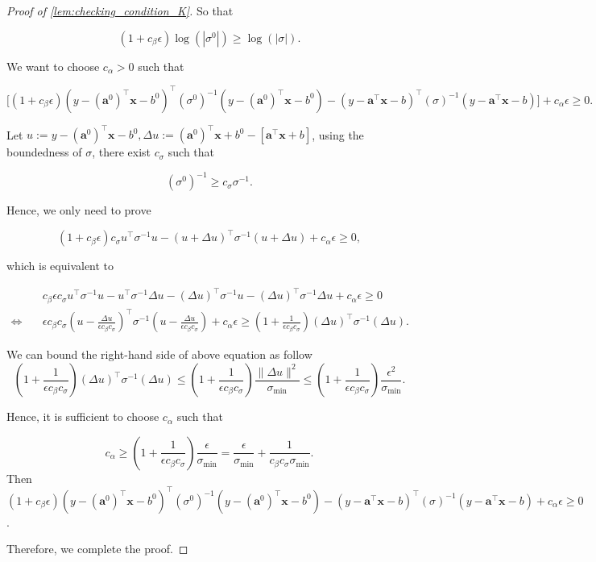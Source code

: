 \documentclass[10pt,a4paper]{amsart}
\def\va{{\bm{a}}}
\def\vx{{\bm{x}}}
\begin{document}
\begin{proof}[Proof of \cref{lem:checking_condition_K}]
So that

$$
\left(1+c_{\beta} \epsilon\right) \log \left(|\sigma^{0}|\right) \geq \log (|\sigma|).
$$

We want to choose $c_{\alpha}>0$ such that

$$
\Big[\left(1+c_{\beta} \epsilon\right)\left(y-(\va^{0})^{\top} \vx-b^{0}\right)^{\top}\left(\sigma^{0}\right)^{-1}\left(y-(\va^{0})^{\top} \vx-b^{0}\right)-(y-\va^{\top} \vx-b)^{\top}(\sigma)^{-1}(y-\va^{\top} \vx-b)\Big]+c_{\alpha} \epsilon \geq 0.
$$

Let $u:=y-(\va^{0})^{\top} \vx-b^{0}, \Delta u:= (\va^{0})^{\top} \vx+b^{0} - [\va^{\top} \vx+b]$, using the boundedness of $\sigma$, there exist $c_{\sigma}$ such that

$$(\sigma^{0})^{-1} \geq c_{\sigma} \sigma^{-1}.$$

Hence, we only need to prove

$$
\left(1+c_{\beta} \epsilon\right) c_{\sigma} u^{\top} \sigma^{-1} u-(u+\Delta u)^{\top} \sigma^{-1}(u+\Delta u)+c_{\alpha} \epsilon \geq 0,
$$

which is equivalent to

\begin{align*}
&c_{\beta} \epsilon c_{\sigma} u^{\top} \sigma^{-1} u-u^{\top} \sigma^{-1} \Delta u-(\Delta u)^{\top} \sigma^{-1} u-(\Delta u)^{\top} \sigma^{-1} \Delta u+c_{\alpha} \epsilon \geq 0 \\
\Leftrightarrow \quad&\epsilon c_{\beta} c_{\sigma}\left(u-\frac{\Delta u}{\epsilon c_{\beta} c_{\sigma}}\right)^{\top} \sigma^{-1}\left(u-\frac{\Delta u}{\epsilon c_{\beta} c_{\sigma}}\right)+c_{\alpha} \epsilon \geq\left(1+\frac{1}{\epsilon c_{\beta} c_{\sigma}}\right)(\Delta u)^{\top} \sigma^{-1}(\Delta u) .
\end{align*}


We can bound the right-hand side of above equation as follow
$$
\left(1+\frac{1}{\epsilon c_{\beta} c_{\sigma}}\right)(\Delta u)^{\top} \sigma^{-1}(\Delta u) \leq\left(1+\frac{1}{\epsilon c_{\beta} c_{\sigma}}\right) \frac{\|\Delta u\|^{2}}{\sigma_{\min }} \leq\left(1+\frac{1}{\epsilon c_{\beta} c_{\sigma}}\right) \frac{\epsilon^{2}}{\sigma_{\min }} .
$$

Hence, it is sufficient to choose $c_{\alpha}$ such that

$$
c_{\alpha} \geq\left(1+\frac{1}{\epsilon c_{\beta} c_{\sigma}}\right) \frac{\epsilon}{\sigma_{\min }}=\frac{\epsilon}{\sigma_{\min }}+\frac{1}{c_{\beta} c_{\sigma} \sigma_{\min }}.
$$
Then
$\left(1+c_{\beta} \epsilon\right)\left(y-(\va^{0})^{\top} \vx-b^{0}\right)^{\top}\left(\sigma^{0}\right)^{-1}\left(y-(\va^{0})^{\top} \vx-b^{0}\right)-(y-\va^{\top} \vx-b)^{\top}(\sigma)^{-1}(y-\va^{\top} \vx-b)+c_{\alpha} \epsilon \geq 0$.

Therefore, we complete the proof.
\end{proof}
\end{document}
